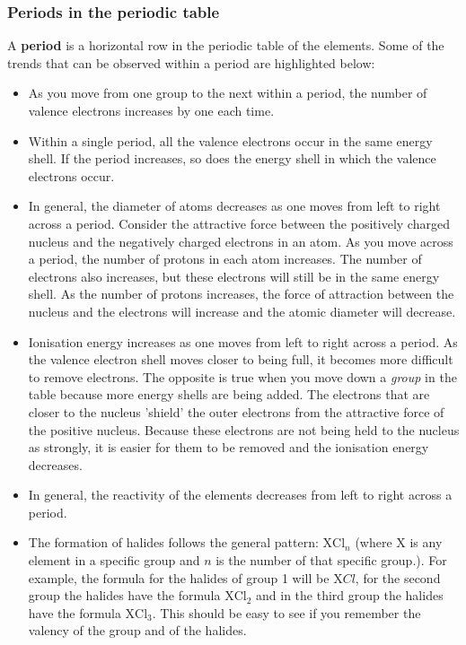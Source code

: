            \subsubsection{ Periods in the periodic table}
            \nopagebreak
            \label{m38760*id261855}A \textbf{period} is a horizontal row in the periodic table of the elements. Some of the trends that can be observed within a period are highlighted below:\par 
        \label{m38760*id261865}\begin{itemize}[noitemsep]
            \label{m38760*uid147}\item As you move from one group to the next within a period, the number of valence electrons increases by one each time.
\label{m38760*uid148}\item Within a single period, all the valence electrons occur in the same energy shell. If the period increases, so does the energy shell in which the valence electrons occur.
\label{m38760*uid149}\item In general, the diameter of atoms decreases as one moves from left to right across a period. Consider the attractive force between the positively charged nucleus and the negatively charged electrons in an atom. As you move across a period, the number of protons in each atom increases. The number of electrons also increases, but these electrons will still be in the same energy shell. As the number of protons increases, the force of attraction between the nucleus and the electrons will increase and the atomic diameter will decrease.
\label{m38760*uid150}\item Ionisation energy increases as one moves from left to right across a period. As the valence electron shell moves closer to being full, it becomes more difficult to remove electrons. The opposite is true when you move down a \textsl{group} in the table because more energy shells are being added. The electrons that are closer to the nucleus 'shield' the outer electrons from the attractive force of the positive nucleus. Because these electrons are not being held to the nucleus as strongly, it is easier for them to be removed and the ionisation energy decreases.
\label{m38760*uid151}\item In general, the reactivity of the elements decreases from left to right across a period.
\label{m38760*id7634}\item The formation of halides follows the general pattern: $\mathrm{X}{\mathrm{Cl}}_{n}$ (where $\mathrm{X}$ is any element in a specific group and $n$ is the number of that specific group.). For example, the formula for the halides of group 1 will be $\mathrm{X}Cl$, for the second group the halides have the formula $\mathrm{X}{\mathrm{Cl}}_{2}$ and in the third group the halides have the formula $\mathrm{X}{\mathrm{Cl}}_{3}$. This should be easy to see if you remember the valency of the group and of the halides.
\end{itemize}
